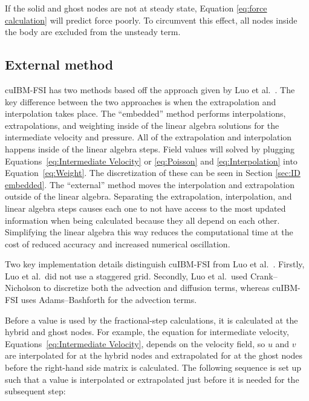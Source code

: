 If the solid and ghost nodes are not at steady state, Equation \eqref{eq:force calculation} will predict force poorly. 
To circumvent this effect, all nodes inside the body are excluded from the unsteady term. 

\subsection{External method}
\label{sec:ID external}
cuIBM-FSI has two methods based off the approach given by Luo et al.~\cite{Luo:2012gx}. 
The key difference between the two approaches is when the extrapolation and interpolation takes place. 
The ``embedded'' method performs  interpolations, extrapolations, and weighting inside of the linear algebra solutions for the intermediate velocity and pressure. 
All of the extrapolation and interpolation happens inside of the linear algebra steps.
Field values will solved by plugging Equations~\eqref{eq:Intermediate Velocity} or \eqref{eq:Poisson} and \eqref{eq:Interpolation} into Equation~\eqref{eq:Weight}. 
The discretization of these can be seen in Section \ref{sec:ID embedded}. 
The ``external'' method moves the interpolation and extrapolation outside of the linear algebra. 
Separating the extrapolation, interpolation, and linear algebra steps causes each one to not have access to the most updated information when being calculated because they all depend on each other. 
Simplifying the linear algebra this way reduces the computational time at the cost of reduced accuracy and increased numerical oscillation. 

Two key implementation details distinguish cuIBM-FSI from Luo et al.~\cite{Luo:2012gx}. 
Firstly, Luo et al.~did not use a staggered grid. 
Secondly, Luo et al.~used Crank--Nicholson to discretize both the advection and diffusion terms, whereas cuIBM-FSI uses Adams--Bashforth for the advection terms. 

Before a value is used by the fractional-step calculations, it is calculated at the hybrid and ghost nodes. 
For example, the equation for intermediate velocity, Equations~\eqref{eq:Intermediate Velocity}, depends on the velocity field, so $u$ and $v$ are interpolated for at the hybrid nodes and extrapolated for at the ghost nodes before the right-hand side matrix is calculated. 
The following sequence is set up such that a value is interpolated or extrapolated just before it is needed for the subsequent step:

